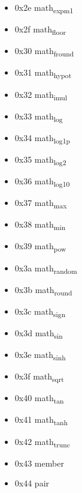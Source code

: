\documentclass[11pt]{article}
\begin{document}
\begin{itemize}
\item 0x2e math\textsubscript{expm1}

\item 0x2f math\textsubscript{floor}

\item 0x30 math\textsubscript{fround}

\item 0x31 math\textsubscript{hypot}

\item 0x32 math\textsubscript{imul}

\item 0x33 math\textsubscript{log}

\item 0x34 math\textsubscript{log1p}

\item 0x35 math\textsubscript{log2}

\item 0x36 math\textsubscript{log10}

\item 0x37 math\textsubscript{max}

\item 0x38 math\textsubscript{min}

\item 0x39 math\textsubscript{pow}

\item 0x3a math\textsubscript{random}

\item 0x3b math\textsubscript{round}

\item 0x3c math\textsubscript{sign}

\item 0x3d math\textsubscript{sin}

\item 0x3e math\textsubscript{sinh}

\item 0x3f math\textsubscript{sqrt}

\item 0x40 math\textsubscript{tan}

\item 0x41 math\textsubscript{tanh}

\item 0x42 math\textsubscript{trunc}

\item 0x43 member

\item 0x44 pair


\end{itemize}
\end{document}
